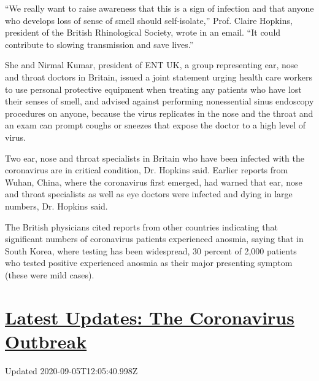 ``We really want to raise awareness that this is a sign of infection and
that anyone who develops loss of sense of smell should self-isolate,''
Prof. Claire Hopkins, president of the British Rhinological Society,
wrote in an email. ``It could contribute to slowing transmission and
save lives.''

She and Nirmal Kumar, president of ENT UK, a group representing ear,
nose and throat doctors in Britain, issued a joint statement urging
health care workers to use personal protective equipment when treating
any patients who have lost their senses of smell, and advised against
performing nonessential sinus endoscopy procedures on anyone, because
the virus replicates in the nose and the throat and an exam can prompt
coughs or sneezes that expose the doctor to a high level of virus.

Two ear, nose and throat specialists in Britain who have been infected
with the coronavirus are in critical condition, Dr. Hopkins said.
Earlier reports from Wuhan, China, where the coronavirus first emerged,
had warned that ear, nose and throat specialists as well as eye doctors
were infected and dying in large numbers, Dr. Hopkins said.

The British physicians cited reports from other countries indicating
that significant numbers of coronavirus patients experienced anosmia,
saying that in South Korea, where testing has been widespread, 30
percent of 2,000 patients who tested positive experienced anosmia as
their major presenting symptom (these were mild cases).

\hypertarget{latest-updates-the-coronavirus-outbreak}{%
\section{\texorpdfstring{\href{https://www.nytimes3xbfgragh.onion/2020/09/04/world/covid-19-coronavirus.html?action=click\&pgtype=Article\&state=default\&region=MAIN_CONTENT_1\&context=storylines_live_updates}{Latest
Updates: The Coronavirus
Outbreak}}{Latest Updates: The Coronavirus Outbreak}}\label{latest-updates-the-coronavirus-outbreak}}

Updated 2020-09-05T12:05:40.998Z

